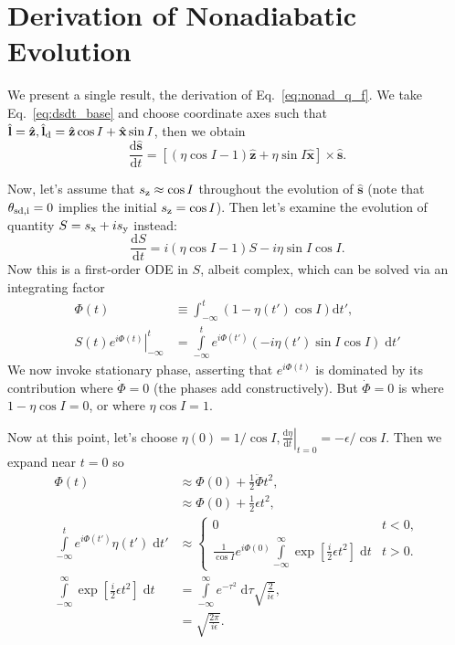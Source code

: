 \documentclass[
        fleqn,
        usenatbib,
        referee,
    ]{mnras}
\newcommand*{\rd}[2]{\frac{\mathrm{d}#1}{\mathrm{d}#2}}
\newcommand*{\at}[1]{\left.#1\right|}
\newcommand*{\bm}[1]{\boldsymbol{\mathbf{#1}}}
\newcommand*{\uv}[1]{\hat{\bm{#1}}}
\newcommand*{\p}[1]{\left(#1\right)}
\newcommand*{\s}[1]{\left[#1\right]}
\begin{document}
\section{Derivation of Nonadiabatic Evolution}\label{s:nonad_app}

We present a single result, the derivation of Eq.~\eqref{eq:nonad_q_f}. We take
Eq.~\eqref{eq:dsdt_base} and choose coordinate axes such that $\uv{l} = \uv{z},
\uv{l}_{\rm d} = \uv{z} \cos I + \uv{x}\sin I$, then we obtain
\begin{equation}
    \rd{\uv{s}}{t} = \s{
        \p{\eta \cos I - 1}\uv{z} + \eta \sin I \uv{x}} \times \uv{s}.
\end{equation}

Now, let's assume that $s_{\rm z} \approx \cos I$ throughout the evolution of
$\uv{s}$ (note that $\theta_{\rm sd, i} = 0$ implies the initial $s_{\rm z} = \cos
I$). Then let's examine the evolution of quantity $S = s_{\rm x} + is_{\rm y}$ instead:
\begin{equation}
    \rd{S}{t} = i\p{\eta\cos I - 1}S - i \eta \sin I\cos I.\label{eq:nonad_ode}
\end{equation}
Now this is a first-order ODE in $S$, albeit complex, which can be solved via
an integrating factor
\begin{align}
    \Phi(t) &\equiv \int_{-\infty}^t \p{1 - \eta(t') \cos I}
        \mathrm{d}t',\\
    \at{S(t) e^{i\Phi(t)}}_{-\infty}^t
        &= \int\limits_{-\infty}^t e^{i\Phi(t')}
            \p{-i\eta(t')\sin I\cos I}\;\mathrm{d}t'\label{eq:nonad_int}
\end{align}
We now invoke stationary phase, asserting that $e^{i\Phi(t)}$ is dominated by
its contribution where $\dot{\Phi} = 0$ (the phases add constructively). But
$\dot{\Phi} = 0$ is where $1 - \eta\cos I = 0$, or where $\eta\cos I = 1$.

Now at this point, let's choose $\eta(0) = 1/\cos I, \at{\rd{\eta}{t}}_{t=0} =
-\epsilon/\cos I$. Then we expand near $t = 0$ so
\begin{align}
    \Phi(t) &\approx \Phi(0) + \frac{1}{2}\ddot{\Phi}t^2,\\
        &\approx \Phi(0) + \frac{1}{2}\epsilon t^2,\\
    \int\limits_{-\infty}^t e^{i\Phi(t')}\eta(t')\;\mathrm{d}t'
        &\approx
        \begin{cases}
            0 & t < 0,\\
            \frac{1}{\cos I}e^{i\Phi(0)}\int\limits_{-\infty}^\infty
                \exp\s{\frac{i}{2}\epsilon t^2}\;\mathrm{d}t
                & t > 0.
        \end{cases}\\
    \int\limits_{-\infty}^\infty
                \exp\s{\frac{i}{2}\epsilon t^2}\;\mathrm{d}t
        &= \int\limits_{-\infty}^\infty e^{-\tau^2}\;\mathrm{d}\tau
            \sqrt{\frac{2}{i\epsilon}},\\
        &= \sqrt{\frac{2\pi}{i\epsilon}}.
\end{align}
\end{document}
